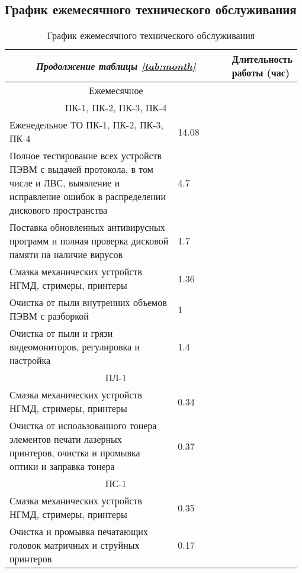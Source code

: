\documentclass[a4paper,14pt]{extarticle}
\begin{document}
\subsection*{График ежемесячного технического обслуживания}
	\small
	\begin{longtable}{|p{0.75\linewidth}|m{0.23\linewidth}|}
	
			\caption{График ежемесячного технического обслуживания}
		\endfirsthead
		
		\multicolumn{2}{c}{\textit{Продолжение таблицы \ref{tab:month}}}
		\endhead
		
		\hline
		\endfoot
		
		
		\endlastfoot
		
		
		\hline
		\multicolumn{1}{|c|}{Наименование работы} & Длительность работы (час) \\ \hline
		\multicolumn{ 2}{|c|}{Ежемесячное} \\ \hline
		\multicolumn{ 2}{|c|}{ПК-1, ПК-2, ПК-3, ПК-4} \\ \hline
		\multicolumn{1}{|l|}{Еженедельное ТО ПК-1, ПК-2, ПК-3, ПК-4} & 14.08 \\ \hline
		Полное тестирование всех устройств ПЭВМ с выдачей протокола, в том числе и ЛВС, выявление и исправление ошибок в распределении дискового пространства  & 4.7 \\ \hline
		Поставка обновленных антивирусных программ и полная проверка дисковой памяти на наличие вирусов  & 1.7 \\ \hline
		Смазка механических устройств НГМД, стримеры, принтеры  & 1.36 \\ \hline
		Очистка от пыли внутренних объемов ПЭВМ с разборкой  & 1 \\ \hline
		Очистка от пыли и грязи видеомониторов, регулировка и настройка  & 1.4 \\ \hline
		\multicolumn{ 2}{|c|}{ПЛ-1} \\ \hline
		Смазка механических устройств НГМД, стримеры, принтеры  & 0.34 \\ \hline
		Очистка от использованного тонера элементов печати лазерных принтеров, очистка и промывка оптики и заправка тонера  & 0.37 \\ \hline
		\multicolumn{ 2}{|c|}{ПС-1} \\ \hline
		Смазка механических устройств НГМД, стримеры, принтеры  & 0.35 \\ \hline
		Очистка и промывка печатающих головок матричных и струйных принтеров  & 0.17 \\ \hline

\end{longtable}
\end{document}
